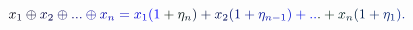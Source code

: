 \documentclass[12pt]{article}
\begin{document}
\makeatletter
\renewcommand*{\@textcolor}[3]{%
  \protect\leavevmode
  \begingroup
    \color#1{#2}#3%
  \endgroup
}
\makeatother
\begin{displaymath}
\mathcolor[RGB]{0,0,15}{x} _ { \mathcolor[RGB]{0,0,30}{1} } \mathcolor[RGB]{0,0,45}{\oplus} \mathcolor[RGB]{0,0,60}{x} _ { \mathcolor[RGB]{0,0,75}{2} } \mathcolor[RGB]{0,0,90}{\oplus} \mathcolor[RGB]{0,0,105}{.} \mathcolor[RGB]{0,0,120}{.} \mathcolor[RGB]{0,0,135}{.} \mathcolor[RGB]{0,0,150}{\oplus} \mathcolor[RGB]{0,0,165}{x} _ { \mathcolor[RGB]{0,0,180}{n} } \mathcolor[RGB]{0,0,195}{=} \mathcolor[RGB]{0,0,210}{x} _ { \mathcolor[RGB]{0,0,225}{1} } \mathcolor[RGB]{0,0,240}{(} \mathcolor[RGB]{0,0,255}{1} \mathcolor[RGB]{0,15,0}{+} \mathcolor[RGB]{0,15,15}{\eta} _ { \mathcolor[RGB]{0,15,30}{n} } \mathcolor[RGB]{0,15,45}{)} \mathcolor[RGB]{0,15,60}{+} \mathcolor[RGB]{0,15,75}{x} _ { \mathcolor[RGB]{0,15,90}{2} } \mathcolor[RGB]{0,15,105}{(} \mathcolor[RGB]{0,15,120}{1} \mathcolor[RGB]{0,15,135}{+} \mathcolor[RGB]{0,15,150}{\eta} _ { \mathcolor[RGB]{0,15,165}{n} \mathcolor[RGB]{0,15,180}{-} \mathcolor[RGB]{0,15,195}{1} } \mathcolor[RGB]{0,15,210}{)} \mathcolor[RGB]{0,15,225}{+} \mathcolor[RGB]{0,15,240}{.} \mathcolor[RGB]{0,15,255}{.} \mathcolor[RGB]{0,30,0}{.} \mathcolor[RGB]{0,30,15}{+} \mathcolor[RGB]{0,30,30}{x} _ { \mathcolor[RGB]{0,30,45}{n} } \mathcolor[RGB]{0,30,60}{(} \mathcolor[RGB]{0,30,75}{1} \mathcolor[RGB]{0,30,90}{+} \mathcolor[RGB]{0,30,105}{\eta} _ { \mathcolor[RGB]{0,30,120}{1} } \mathcolor[RGB]{0,30,135}{)} \mathcolor[RGB]{0,30,150}{.}
\end{displaymath}
\end{document}
